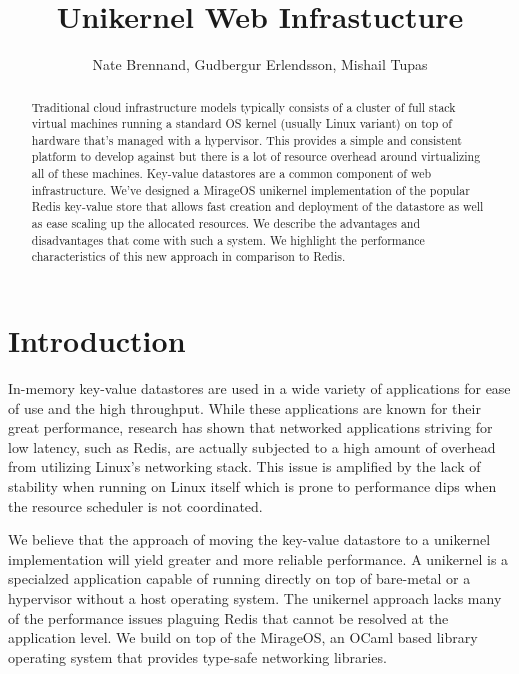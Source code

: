 \documentclass[english,10pt,twocolumn]{article}
\begin{document}
\title{Unikernel Web Infrastucture}
\author{Nate Brennand, Gudbergur Erlendsson, Mishail Tupas}
\date{}
\maketitle
\thispagestyle{empty}

\begin{abstract}
  Traditional cloud infrastructure models typically consists of a cluster of full stack virtual machines running a standard OS kernel (usually Linux variant) on top of hardware that's managed with a hypervisor.
  This provides a simple and consistent platform to develop against but there is a lot of resource overhead around virtualizing all of these machines.
  Key-value datastores are a common component of web infrastructure.
  We've designed a MirageOS\cite{mirage} unikernel implementation of the popular Redis\cite{redis} key-value store that allows fast creation and deployment of the datastore as well as ease scaling up the allocated resources.
  We describe the advantages and disadvantages that come with such a system.
  We highlight the performance characteristics of this new approach in comparison to Redis.
\end{abstract}

\section{Introduction}
In-memory key-value datastores are used in a wide variety of applications for ease of use and the high throughput.
While these applications are known for their great performance, research has shown that networked applications striving for low latency, such as Redis, are actually subjected to a high amount of overhead from utilizing Linux's networking stack.\cite{arrakis}
This issue is amplified by the lack of stability when running on Linux itself which is prone to performance dips when the resource scheduler is not coordinated.

We believe that the approach of moving the key-value datastore to a unikernel implementation will yield greater and more reliable performance.
A unikernel is a specialzed application capable of running directly on top of bare-metal or a hypervisor without a host operating system.
The unikernel approach lacks many of the performance issues plaguing Redis that cannot be resolved at the application level.
We build on top of the MirageOS\cite{mirage}, an OCaml based library operating system that provides type-safe networking libraries.
\end{document}
